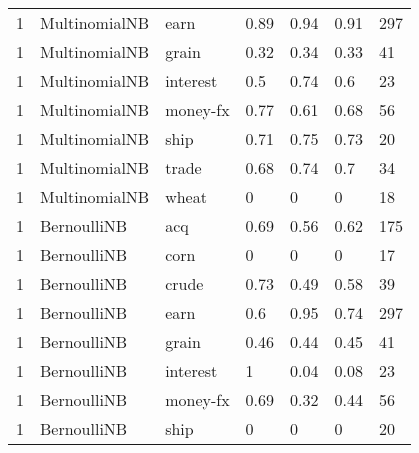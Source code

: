\documentclass{article}
\begin{document}
\begin{table}[h]
\begin{tabular}{lllllll}
1             & MultinomialNB          & earn            & 0.89               & 0.94            & 0.91              & 297              \\
1             & MultinomialNB          & grain           & 0.32               & 0.34            & 0.33              & 41               \\
1             & MultinomialNB          & interest        & 0.5                & 0.74            & 0.6               & 23               \\
1             & MultinomialNB          & money-fx        & 0.77               & 0.61            & 0.68              & 56               \\
1             & MultinomialNB          & ship            & 0.71               & 0.75            & 0.73              & 20               \\
1             & MultinomialNB          & trade           & 0.68               & 0.74            & 0.7               & 34               \\
1             & MultinomialNB          & wheat           & 0                  & 0               & 0                 & 18               \\
1             & BernoulliNB            & acq             & 0.69               & 0.56            & 0.62              & 175              \\
1             & BernoulliNB            & corn            & 0                  & 0               & 0                 & 17               \\
1             & BernoulliNB            & crude           & 0.73               & 0.49            & 0.58              & 39               \\
1             & BernoulliNB            & earn            & 0.6                & 0.95            & 0.74              & 297              \\
1             & BernoulliNB            & grain           & 0.46               & 0.44            & 0.45              & 41               \\
1             & BernoulliNB            & interest        & 1                  & 0.04            & 0.08              & 23               \\
1             & BernoulliNB            & money-fx        & 0.69               & 0.32            & 0.44              & 56               \\
1             & BernoulliNB            & ship            & 0                  & 0               & 0                 & 20               \\

\end{tabular}
\end{table}
\end{document}
